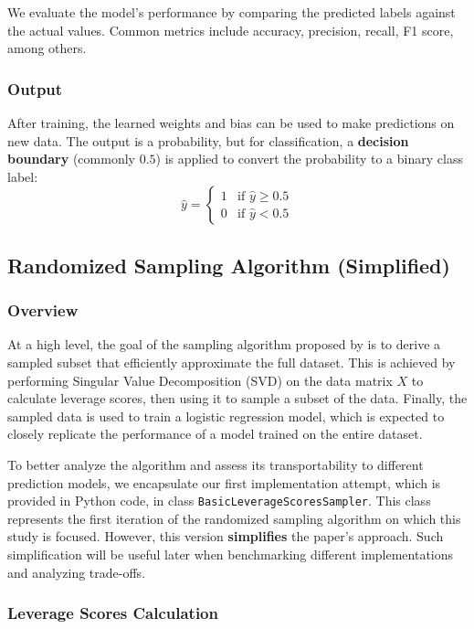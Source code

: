 \documentclass{article}
\theoremstyle{plain}
\theoremstyle{definition}
\theoremstyle{remark}
\begin{document}
We evaluate the model’s performance by comparing the predicted labels against the actual values. Common metrics include accuracy, precision, recall, F1 score, among others.


\subsubsection{Output}

After training, the learned weights and bias can be used to make predictions on new data. The output is a probability, but for classification, a \textbf{decision boundary} (commonly $0.5$) is applied to convert the probability to a binary class label:
$$
\hat{y} = \begin{cases}
1 & \text{if } \hat{y} \geq 0.5 \\
0 & \text{if } \hat{y} < 0.5
\end{cases}
$$


\subsection{Randomized Sampling Algorithm (Simplified)}

\subsubsection{Overview}

At a high level, the goal of the sampling algorithm proposed by \citeauthor{chow24} is to derive a sampled subset that efficiently approximate the full dataset. This is achieved by performing Singular Value Decomposition (SVD) on the data matrix $X$ to calculate leverage scores, then using it to sample a subset of the data. Finally, the sampled data is used to train a logistic regression model, which is expected to closely replicate the performance of a model trained on the entire dataset.

To better analyze the algorithm and assess its transportability to different prediction models, we encapsulate our first implementation attempt, which is provided in Python code, in class \texttt{BasicLeverageScoresSampler}. This class represents the first iteration of the randomized sampling algorithm on which this study is focused. However, this version \textbf{simplifies} the paper's approach. Such simplification will be useful later when benchmarking different implementations and analyzing trade-offs.


\subsubsection{Leverage Scores Calculation}
\end{document}
